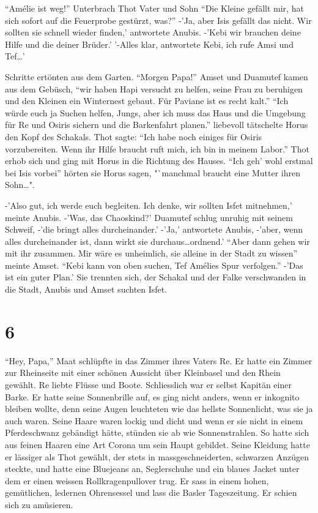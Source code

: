 \documentclass[11pt,titlepage,a5paper]{book}
\begin{document}
"`Amélie ist weg!"' Unterbrach Thot Vater und Sohn "`Die Kleine gefällt mir, hat sich sofort auf die Feuerprobe gestürzt, was?"' -'Ja, aber Isis gefällt das nicht. Wir sollten sie schnell wieder finden,' antwortete Anubis. -'Kebi wir brauchen deine Hilfe und die deiner Brüder.' '-Alles klar, antwortete Kebi, ich rufe Amsi und Tef\dots ' 

Schritte ertönten aus dem Garten. "`Morgen Papa!"' Amset und Duamutef kamen aus dem Gebüsch, "`wir haben Hapi versucht zu helfen, seine Frau zu beruhigen und den Kleinen ein Winternest gebaut. Für Paviane ist es recht kalt."' "`Ich würde euch ja Suchen helfen, Jungs, aber ich muss das Haus und die Umgebung für Re und Osiris sichern und die Barkenfahrt planen."' liebevoll tätschelte Horus den Kopf des Schakals. Thot sagte: "`Ich habe noch einiges für Osiris vorzubereiten. Wenn ihr Hilfe braucht ruft mich, ich bin in meinem Labor."' Thot erhob sich und ging mit Horus in die Richtung des Hauses. "`Ich geh' wohl erstmal bei Isis vorbei"' hörten sie Horus sagen, "`manchmal braucht eine Mutter ihren Sohn\dots".

-'Also gut, ich werde euch begleiten. Ich denke, wir sollten Isfet mitnehmen,' meinte Anubis. -'Was, das Chaoskind?' Duamutef schlug unruhig mit seinem Schweif, -'die bringt alles durcheinander.' -'Ja,' antwortete Anubis, -'aber, wenn alles durcheinander ist, dann wirkt sie durchaus\dots ordnend.' "`Aber dann gehen wir mit ihr zusammen. Mir wäre es unheimlich, sie alleine in der Stadt zu wissen"' meinte Amset. "`Kebi kann von oben suchen, Tef Amélies Spur verfolgen."' -'Das ist ein guter Plan.' Sie trennten sich, der Schakal und der Falke verschwanden in die Stadt, Anubis und Amset suchten Isfet.

\section*{6}


"`Hey, Papa,"' Maat schlüpfte in das Zimmer ihres Vaters Re. Er hatte ein Zimmer zur Rheinseite mit einer schönen Aussicht über Kleinbasel und den Rhein gewählt. Re liebte Flüsse und Boote. Schliesslich war er selbst Kapitän einer Barke. Er hatte seine Sonnenbrille auf, es ging nicht anders, wenn er inkognito bleiben wollte, denn seine Augen leuchteten wie das hellste Sonnenlicht, was sie ja auch waren. Seine Haare waren lockig und dicht und wenn er sie nicht in einem Pferdeschwanz gebändigt hätte, stünden sie ab wie Sonnenstrahlen. So hatte sich aus feinen Haaren eine Art Corona um sein Haupt gebildet. Seine Kleidung hatte er lässiger als Thot gewählt, der stets in massgeschneiderten, schwarzen Anzügen steckte, und hatte eine Bluejeans an, Seglerschuhe und ein blaues Jacket unter dem er einen weissen Rollkragenpullover trug. Er sass in einem hohen, gemütlichen, ledernen Ohrensessel und lass die Basler Tageszeitung. Er schien sich zu amüsieren.
\end{document}

